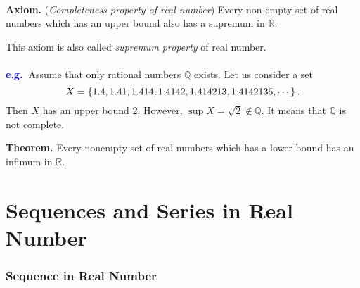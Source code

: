 \documentclass[12pt,a4paper]{article}
\newcommand{\eg}{\textcolor{blue}{\bf e.g.\ \quad }}
\begin{document}
\
\begin{tcolorbox}[colback=white]
	\textbf{Axiom.} (\textit{Completeness property of real number}) Every non-empty set of real numbers which has an upper bound also has a supremum in $\mathbb{R}$.
\end{tcolorbox}
This axiom is also called \textit{supremum property} of real number.\\
\\
\eg Assume that only rational numbers $\mathbb{Q}$ exists. Let us consider a set \[
X=\set{1.4, 1.41, 1.414, 1.4142, 1.414213, 1.4142135, \cdots}.
\] Then $X$ has an upper bound 2. However, $\sup X=\sqrt{2}\notin\mathbb{Q}$. It means that $\mathbb{Q}$ is not complete.\\

\begin{tcolorbox}[colback=white]
	\textbf{Theorem.} Every nonempty set of real numbers which has a lower bound has an infimum in $\mathbb{R}$.
\end{tcolorbox}

\newpage
\part{Sequences and Series in Real Number}

\section{Sequence in Real Number}
\end{document}
